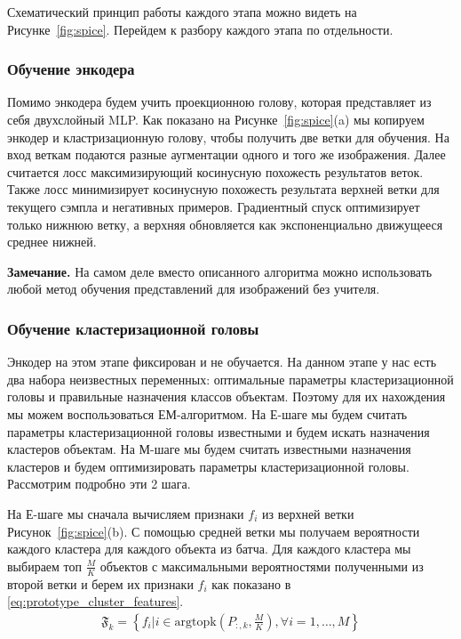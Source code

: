\documentclass[a4paper,12pt]{extarticle}
\begin{document}
Схематический принцип работы каждого этапа можно видеть 
на Рисунке~\ref{fig:spice}. Перейдем к разбору каждого этапа
по отдельности.

\subsubsection{Обучение энкодера}

Помимо энкодера будем учить проекционною голову, которая 
представляет из себя двухслойный MLP. Как показано на 
Рисунке~\ref{fig:spice}(a) мы копируем энкодер и 
кластризационную голову, чтобы получить две ветки 
для обучения. На вход веткам подаются разные аугментации 
одного и того же изображения. Далее считается
лосс максимизирующий косинусную похожесть результатов веток. 
Также лосс минимизирует косинусную похожесть результата 
верхней ветки для текущего сэмпла и негативных примеров. 
Градиентный спуск оптимизирует только нижнюю ветку, 
а верхняя обновляется 
как экспоненциально движущееся среднее нижней. 

\textbf{Замечание.} На самом деле вместо описанного 
алгоритма можно использовать любой метод обучения представлений
для изображений без учителя.

\subsubsection{Обучение кластеризационной головы}

Энкодер на этом этапе фиксирован и не обучается. 
На данном этапе у нас есть два набора неизвестных переменных:
оптимальные параметры кластеризационной головы и правильные назначения 
классов объектам. Поэтому для их нахождения мы можем воспользоваться ЕМ-алгоритмом.
На Е-шаге мы будем считать параметры кластеризационной головы известными 
и будем искать назначения кластеров объектам. На М-шаге мы будем 
считать известными назначения кластеров и будем оптимизировать параметры 
кластеризационной головы. Рассмотрим подробно эти 2 шага.

На Е-шаге мы сначала вычисляем признаки $f_i$ из 
верхней ветки Рисунок~\ref{fig:spice}(b). С помощью 
средней ветки мы получаем вероятности каждого кластера для 
каждого объекта из батча. Для каждого кластера мы выбираем 
топ $\frac{M}{K}$ объектов с максимальными 
вероятностями полученными из второй ветки и берем их признаки
$f_i$ как показано в \ref{eq:prototype_cluster_features}.
\begin{align}\label{eq:prototype_cluster_features}
	\mathfrak{F}_k=\left\{f_i\Big\vert i\in\text{argtopk}\left(P_{:,k}, \frac{M}{K}\right), 
	\forall i=1, \ldots, M \right\}
\end{align}
\end{document}
